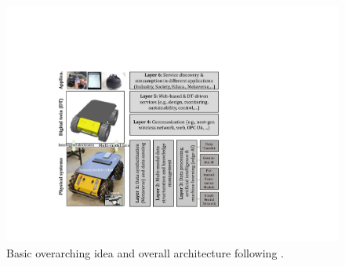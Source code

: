 \documentclass[conference]{IEEEtran}
\begin{document}
\begin{figure}[htbp]
    \centerline{\includegraphics[width=0.9\columnwidth]{Pictures/layer0.pdf}}
    \caption{Basic overarching idea and overall architecture following \cite{kaigom,kaigom2020value}.}
    \label{fig:3dreal}
\end{figure}
\end{document}
